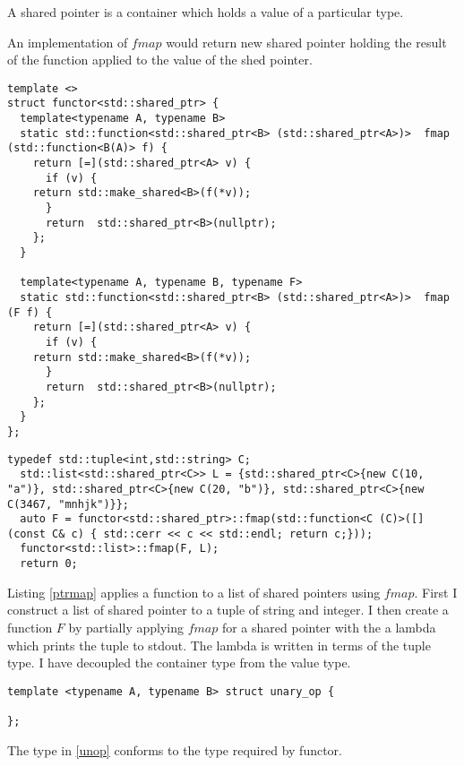 \documentclass[12pt,fleqn]{article}
\begin{document}
A shared pointer is a container which holds a value of a particular type.

An implementation of $fmap$ would return new shared pointer holding the result of the function applied to the value of the shed pointer.

\begin{lstlisting}[caption=shared pointer as container, label=shp]
template <>
struct functor<std::shared_ptr> {
  template<typename A, typename B>
  static std::function<std::shared_ptr<B> (std::shared_ptr<A>)>  fmap (std::function<B(A)> f) {
    return [=](std::shared_ptr<A> v) {
      if (v) {
	return std::make_shared<B>(f(*v)); 
      }
      return  std::shared_ptr<B>(nullptr);
    };
  }

  template<typename A, typename B, typename F>
  static std::function<std::shared_ptr<B> (std::shared_ptr<A>)>  fmap (F f) {
    return [=](std::shared_ptr<A> v) {
      if (v) {
	return std::make_shared<B>(f(*v)); 
      }
      return  std::shared_ptr<B>(nullptr);
    };
  }
};
\end{lstlisting}

\begin{lstlisting}[caption=mapping over a list of shared pointers, label=ptrmap]
  typedef std::tuple<int,std::string> C;
  std::list<std::shared_ptr<C>> L = {std::shared_ptr<C>{new C(10, "a")}, std::shared_ptr<C>{new C(20, "b")}, std::shared_ptr<C>{new C(3467, "mnhjk")}};
  auto F = functor<std::shared_ptr>::fmap(std::function<C (C)>([](const C& c) { std::cerr << c << std::endl; return c;}));
  functor<std::list>::fmap(F, L);
  return 0;
\end{lstlisting}

Listing \ref{ptrmap} applies a function to a list of shared pointers using $fmap$.
First I construct a list of shared pointer to a tuple of string and integer.
I then create a function $F$ by partially applying $fmap$ for a shared pointer with the a lambda which prints the tuple to stdout.
The lambda is written in terms of the tuple type.
I have decoupled the container type from the value type.

\begin{lstlisting}[caption=unary operator, label=unop]
template <typename A, typename B> struct unary_op {
  
};
\end{lstlisting}

The type in \ref{unop} conforms to the type required by functor.
\end{document}
